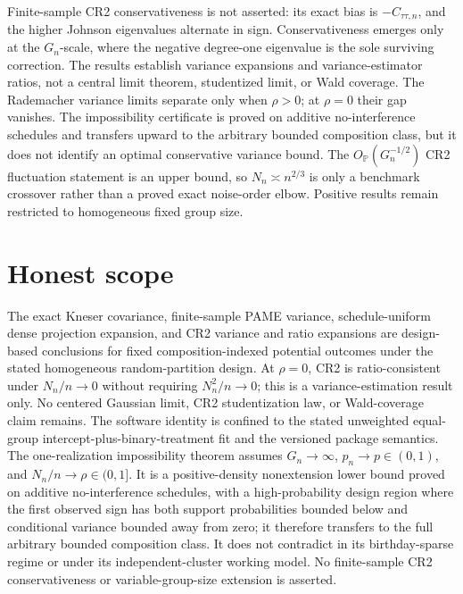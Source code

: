 \documentclass{article}
\begin{document}
Finite-sample CR2 conservativeness is not asserted: its exact bias is \(-C_{\tau\tau,n}\), and the higher Johnson eigenvalues alternate in sign. Conservativeness emerges only at the \(G_n\)-scale, where the negative degree-one eigenvalue is the sole surviving correction. The results establish variance expansions and variance-estimator ratios, not a central limit theorem, studentized limit, or Wald coverage. The Rademacher variance limits separate only when \(\rho>0\); at \(\rho=0\) their gap vanishes. The impossibility certificate is proved on additive no-interference schedules and transfers upward to the arbitrary bounded composition class, but it does not identify an optimal conservative variance bound. The \(O_{\mathbb P}(G_n^{-1/2})\) CR2 fluctuation statement is an upper bound, so \(N_n\asymp n^{2/3}\) is only a benchmark crossover rather than a proved exact noise-order elbow. Positive results remain restricted to homogeneous fixed group size.

\section{Honest scope}

The exact Kneser covariance, finite-sample PAME variance, schedule-uniform dense projection expansion, and CR2 variance and ratio expansions are design-based conclusions for fixed composition-indexed potential outcomes under the stated homogeneous random-partition design. At \(\rho=0\), CR2 is ratio-consistent under \(N_n/n\to0\) without requiring \(N_n^2/n\to0\); this is a variance-estimation result only. No centered Gaussian limit, CR2 studentization law, or Wald-coverage claim remains. The software identity is confined to the stated unweighted equal-group intercept-plus-binary-treatment fit and the versioned package semantics. The one-realization impossibility theorem assumes \(G_n\to\infty\), \(p_n\to p\in(0,1)\), and \(N_n/n\to\rho\in(0,1]\). It is a positive-density nonextension lower bound proved on additive no-interference schedules, with a high-probability design region where the first observed sign has both support probabilities bounded below and conditional variance bounded away from zero; it therefore transfers to the full arbitrary bounded composition class. It does not contradict \cite{FuSamiiWang2026} in its birthday-sparse regime or \cite{PustejovskyTipton2018} under its independent-cluster working model. No finite-sample CR2 conservativeness or variable-group-size extension is asserted.
\end{document}
